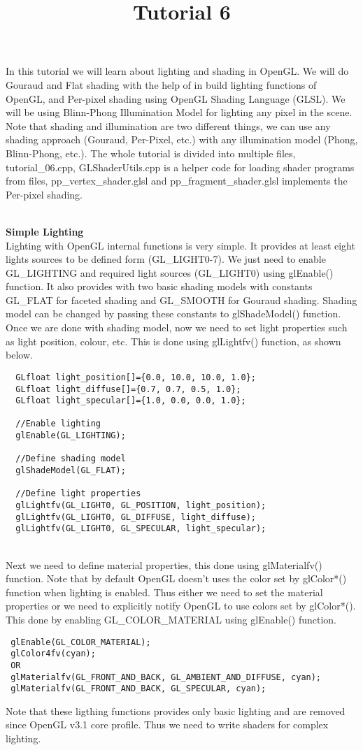 \documentclass[11pt]{article}
\title{\textbf{Tutorial 6}}
\date{}
\begin{document}
\maketitle


In this tutorial we will learn about lighting and shading in OpenGL. We will do Gouraud and Flat shading with the help of in build lighting functions of OpenGL, and Per-pixel shading using OpenGL Shading Language (GLSL). We will be using Blinn-Phong Illumination Model for lighting any pixel in the scene. Note that shading and illumination are two different things, we can use any shading approach (Gouraud, Per-Pixel, etc.) with any illumination model (Phong, Blinn-Phong, etc.). The whole tutorial is divided into multiple files, tutorial\_06.cpp, GLShaderUtils.cpp is a helper code for loading shader programs from files, pp\_vertex\_shader.glsl and pp\_fragment\_shader.glsl implements the Per-pixel shading.


\noindent\\
\textbf{Simple Lighting}\\
Lighting with OpenGL internal functions is very simple. It provides at least eight lights sources to be defined form (GL\_LIGHT0-7). We just need to enable GL\_LIGHTING and required light sources (GL\_LIGHT0) using glEnable() function. It also provides with two basic shading models with constants GL\_FLAT for faceted shading and GL\_SMOOTH for Gouraud shading. Shading model can be changed by passing these constants to glShadeModel() function. Once we are done with shading model, now we need to set light properties such as light position, colour, etc. This is done using glLightfv() function, as shown below.
\begin{lstlisting}
  GLfloat light_position[]={0.0, 10.0, 10.0, 1.0};
  GLfloat light_diffuse[]={0.7, 0.7, 0.5, 1.0};
  GLfloat light_specular[]={1.0, 0.0, 0.0, 1.0};

  //Enable lighting
  glEnable(GL_LIGHTING);
  
  //Define shading model
  glShadeModel(GL_FLAT);
  
  //Define light properties
  glLightfv(GL_LIGHT0, GL_POSITION, light_position);
  glLightfv(GL_LIGHT0, GL_DIFFUSE, light_diffuse);
  glLightfv(GL_LIGHT0, GL_SPECULAR, light_specular);
\end{lstlisting}
\noindent\\
Next we need to define material properties, this done using glMaterialfv() function. Note that by default OpenGL doesn't uses the color set by glColor*() function when lighting is enabled. Thus either we need to set the material properties or we need to explicitly notify OpenGL to use colors set by glColor*(). This done by enabling GL\_COLOR\_MATERIAL using glEnable() function.
\begin{lstlisting}
 glEnable(GL_COLOR_MATERIAL);
 glColor4fv(cyan);
 OR
 glMaterialfv(GL_FRONT_AND_BACK, GL_AMBIENT_AND_DIFFUSE, cyan);
 glMaterialfv(GL_FRONT_AND_BACK, GL_SPECULAR, cyan);
\end{lstlisting}
Note that these ligthing functions provides only basic lighting and are removed since OpenGL v3.1 core profile. Thus we need to write shaders for complex lighting.
\end{document}
